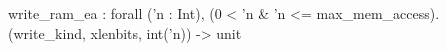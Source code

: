 write_ram_ea : forall ('n : Int), (0 < 'n & 'n <= max_mem_access). (write_kind, xlenbits, int('n)) -> unit